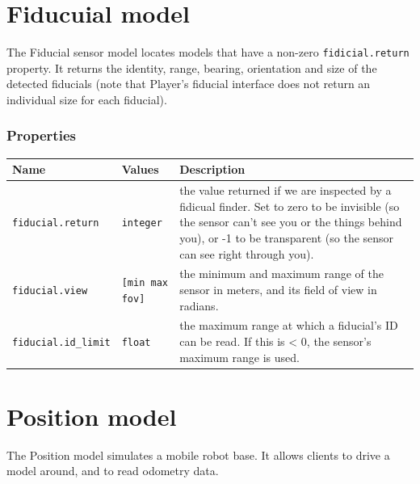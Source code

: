 \documentclass[letter,11pt,twoside]{report}
\begin{document}
\newpage
\section{Fiducuial model}

The Fiducial sensor model locates models that have a non-zero
\verb'fidicial.return' property. It returns the identity, range, bearing,
orientation and size of the detected fiducials (note that Player's
fiducial interface does not return an individual size for each
fiducial).

\subsubsection*{Properties}
\begin{tabularx}{\columnwidth}{llX}
\hline
Name & Values & Description \\
\hline

\verb'fiducial.return' & \verb'integer' & the value returned if we are
inspected by a fidicual finder. Set to zero to be invisible (so the
sensor can't see you or the things behind you), or -1 to be
transparent (so the sensor can see right through you).\\

\verb'fiducial.view' & \verb'[min max fov]' & the minimum and
maximum range of the sensor in meters, and its field of view in
radians.\\

\verb'fiducial.id_limit' & \verb'float' & the maximum range at which a
fiducial's ID can be read. If this is < 0, the sensor's maximum range
is used.\\ \hline
\end{tabularx}

\newpage
\section{Position model}

The Position model simulates a mobile robot base. It allows clients to
drive a model around, and to read odometry data.
\end{document}
